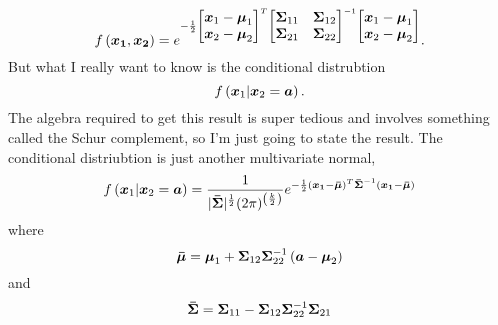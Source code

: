 \documentclass[../../main.tex]{subfiles}
\begin{document}
\begin{equation}
    f\left(\boldsymbol{x_1}, \boldsymbol{x_2} \right)
     = e^{
        -\frac{1}{2}
        \begin{bmatrix}
            \boldsymbol{x}_1 - \boldsymbol{\mu}_1 \\
            \boldsymbol{x}_2 - \boldsymbol{\mu}_2
        \end{bmatrix}^T
        \begin{bmatrix}
            \boldsymbol{\Sigma}_{11} & \boldsymbol{\Sigma}_{12} \\ 
            \boldsymbol{\Sigma}_{21} & \boldsymbol{\Sigma}_{22} \\
        \end{bmatrix}^{-1}
        \begin{bmatrix}
            \boldsymbol{x}_1 - \boldsymbol{\mu}_1 \\
            \boldsymbol{x}_2 - \boldsymbol{\mu}_2
        \end{bmatrix}
     }.
\end{equation}
But what I really want to know is the conditional distrubtion
\begin{equation}
    f\left(\boldsymbol{x}_1| \boldsymbol{x}_2=\boldsymbol{a} \right).
\end{equation}
The algebra required to get this result is super tedious and involves
something called the Schur complement, so I'm just going to state the result.
The conditional distriubtion is just another multivariate normal, 
\begin{equation}
    f\left(\boldsymbol{x}_1| \boldsymbol{x}_2=\boldsymbol{a} \right) = 
        \frac{1}{
                    |\boldsymbol{\bar\Sigma}|^\frac{1}{2} (2\pi)^{\left(\frac{k}{2}\right)}
                }
                e^{
                    -\frac{1}{2}
                    (\boldsymbol{x_1} - \boldsymbol{\bar\mu})^T
                    \boldsymbol{\bar\Sigma}^{-1}
                    (\boldsymbol{x_1} - \boldsymbol{\bar\mu})
            }
\end{equation}
where
\begin{equation}
    \boldsymbol{\bar{\mu}} = \boldsymbol{\mu}_1 + \boldsymbol{\Sigma}_{12}\boldsymbol{\Sigma}_{22}^{-1}
    \left( \boldsymbol{a} - \boldsymbol{\mu}_2 \right)
\end{equation}
and
\begin{equation}
    \boldsymbol{\bar{\Sigma}} =
    \boldsymbol{\Sigma}_{11} - \boldsymbol{\Sigma}_{12}\boldsymbol{\Sigma}_{22}^{-1}\boldsymbol{\Sigma}_{21}
\end{equation}
\end{document}
